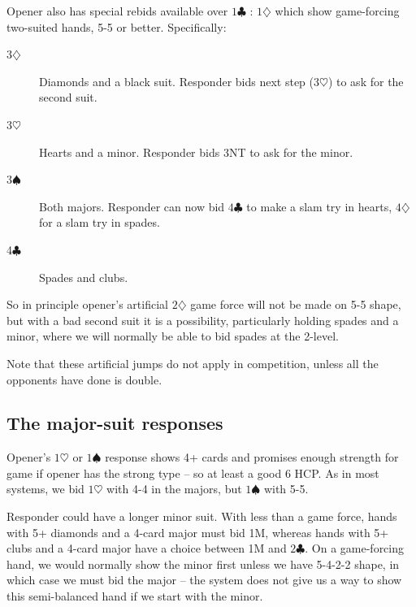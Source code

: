 \documentclass{article}
\newcommand{\sz}{\spadesuit}
\newcommand{\hz}{\heartsuit}
\newcommand{\dz}{\diamondsuit}
\newcommand{\cz}{\clubsuit}
\begin{document}
\vspace{3mm}
Opener also has special rebids available over $1\cz$ : $1\dz$ which show game-forcing two-suited hands, 5-5 or better. Specifically:
\begin{description}
\item[3$\dz$] Diamonds and a black suit. Responder bids next step ($3\hz$) to ask for the second suit.
\item[3$\hz$] Hearts and a minor. Responder bids 3NT to ask for the minor.
\item[3$\sz$] Both majors. Responder can now bid $4\cz$ to make a slam try in hearts, $4\dz$ for a slam try in spades.
\item[4$\cz$] Spades and clubs.
\end{description}
So in principle opener's artificial $2\dz$ game force will not be made on 5-5 shape, but with a bad second suit it is a possibility, particularly holding spades and a minor, where we will normally be able to bid spades at the 2-level.

Note that these artificial jumps do not apply in competition, unless all the opponents have done is double.

\subsection{The major-suit responses}

Opener's $1\hz$ or $1\sz$ response shows 4+ cards and promises enough strength for game if opener has the strong type -- so at least a good 6 HCP. As in most systems, we bid $1\hz$ with 4-4 in the majors, but $1\sz$ with 5-5.

Responder could have a longer minor suit. With less than a game force, hands with 5+ diamonds and a 4-card major must bid 1M, whereas hands with 5+ clubs and a 4-card major have a choice between 1M and $2\cz$. On a game-forcing hand, we would normally show the minor first unless we have 5-4-2-2 shape, in which case we must bid the major -- the system does not give us a way to show this semi-balanced hand if we start with the minor.
\end{document}

